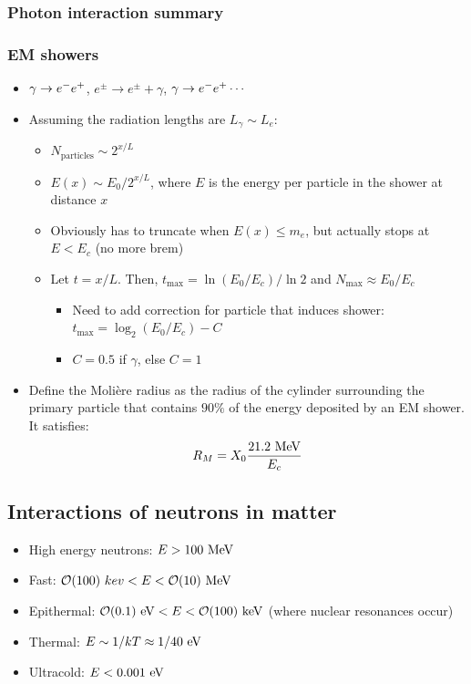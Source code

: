 \subsubsection{Photon interaction summary}


\subsubsection{EM showers}
\begin{itemize}
  \item $\gamma\rightarrow e^{-}e^{+}$, $e^\pm\rightarrow e^\pm+\gamma$, $\gamma\rightarrow e^{-}e^{+}\cdots$
  \item Assuming the radiation lengths are $L_\gamma\sim L_e$:
  \begin{itemize}
    \item $N_\text{particles}\sim 2^{x/L}$
    \item $E(x)\sim E_0/2^{x/L}$, where $E$ is the energy per particle in the shower at distance $x$
    \item Obviously has to truncate when $E(x)\leq m_e$, but actually stops at $E<E_c$ (no more brem)
    \item Let $t=x/L$. Then, $t_{\max} = \ln(E_0/E_c)/\ln2$ and $N_{\max}\approx E_0/E_c$
    \begin{itemize}
      \item Need to add correction for particle that induces shower: $t_{\max} = \log_2 (E_0/E_c) - C$
      \item $C = 0.5$ if $\gamma$, else $C = 1$ 
    \end{itemize}
  \end{itemize}
  \item Define the Moli\`ere radius as the radius of the cylinder surrounding the primary particle that contains $90\%$ of the energy deposited by an EM shower. It satisfies:
  \begin{equation}
    R_M = X_0 \frac{21.2~\text{MeV}}{E_c}
  \end{equation}
\end{itemize}

\subsection{Interactions of neutrons in matter}
\begin{itemize}
  \item High energy neutrons: $E>100~\text{MeV}$
  \item Fast: $\mathcal{O}(100)~kev < E < \mathcal{O}(10)~\text{MeV}$
  \item Epithermal: $\mathcal{O}(0.1)~\text{eV} < E <\mathcal{O}(100)~\text{keV}$ (where nuclear resonances occur)
  \item Thermal: $E\sim 1/kT \approx 1/40~\text{eV}$
  \item Ultracold: $E<0.001~\text{eV}$
\end{itemize}
